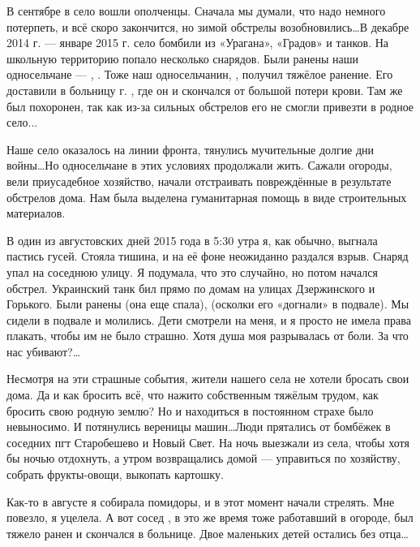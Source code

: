 В сентябре в село вошли ополченцы. Сначала мы думали, что надо немного
потерпеть, и всё скоро закончится, но зимой обстрелы возобновились\ldots В декабре
2014 г. --- январе 2015 г. село бомбили из «Урагана», «Градов» и танков. На
школьную территорию попало несколько снарядов. Были ранены наши односельчане ---
, . Тоже наш односельчанин, 
, получил тяжёлое ранение. Его доставили в больницу г. , где
он и скончался от большой потери крови. Там же был похоронен, так как из-за
сильных обстрелов его не смогли привезти в родное село...

Наше село оказалось на линии фронта, тянулись мучительные долгие дни войны\ldots Но
односельчане в этих условиях продолжали жить. Сажали огороды, вели приусадебное
хозяйство, начали отстраивать повреждённые в результате обстрелов дома. Нам
была выделена гуманитарная помощь в виде строительных материалов.

В один из августовских дней 2015 года в 5:30 утра я, как обычно, выгнала
пастись гусей. Стояла тишина, и на её фоне неожиданно раздался взрыв. Снаряд
упал на соседнюю улицу. Я подумала, что это случайно, но потом начался обстрел.
Украинский танк бил прямо по домам на улицах Дзержинского и Горького. Были
ранены  (она еще спала),  (осколки его
«догнали» в подвале). Мы сидели в подвале и молились. Дети смотрели на меня, и
я просто не имела права плакать, чтобы им не было страшно. Хотя душа моя
разрывалась от боли. За что нас убивают?\ldots
{}

Несмотря на эти страшные события, жители нашего села не хотели бросать свои
дома. Да и как бросить всё, что нажито собственным тяжёлым трудом, как бросить
свою родную землю? Но и находиться в постоянном страхе было невыносимо. И
потянулись вереницы машин\ldots Люди прятались от бомбёжек в соседних пгт
Старобешево и Новый Свет. На ночь выезжали из села, чтобы хотя бы ночью
отдохнуть, а утром возвращались домой --- управиться по хозяйству, собрать
фрукты-овощи, выкопать картошку.

Как-то в августе я собирала помидоры, и в этот момент начали стрелять. Мне
повезло, я уцелела. А вот сосед , в это же время тоже работавший в
огороде, был тяжело ранен и скончался в больнице. Двое маленьких детей остались
без отца\ldots
{}

